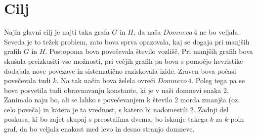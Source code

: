 \documentclass[12pt, a4paper]{article}
\begin{document}
\section{Cilj}

Najin glavni cilj je najti taka grafa $G$ in $H$, da naša $Domneva \, 4$ ne bo veljala. Seveda je to težek problem, zato bova sprva opazovala, kaj se dogaja pri manjših grafih $G$ in $H$. Postopoma bova povečevala število vozlišč. Pri manjših grafih bova skušala preizkusiti vse možnosti, pri večjih grafih pa bova s pomočjo hevristike dodajala nove povezave in sistematično raziskovala izide. Zraven bova počasi povečevala tudi $k$. Na tak način bova želela ovreči $Domnevo \, 4$.
Poleg tega pa se bova posvetila tudi obravnavanju konstante, ki je v naši domnevi enaka 2. Zanimalo naju bo, ali se lahko s povečevanjem k število 2 morda zmanjša (oz. celo poveča) in katera je ta vrednost, s katero bi nadomestili 2.
Zadnji del poskusa, ki bo zajet skupaj s preostalima dvema, bo iskanje takega $k$ za $k$-poln graf, da bo veljala enakost med levo in desno stranjo domneve.
\end{document}

